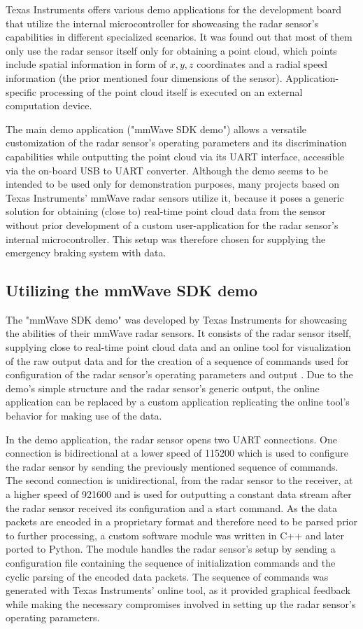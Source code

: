 \FloatBarrier\noindent
Texas Instruments offers various demo applications for the development board that utilize the internal microcontroller for showcasing the radar sensor's capabilities in different specialized scenarios.
It was found out that most of them only use the radar sensor itself only for obtaining a point cloud, which points include spatial information in form of $x,y,z$ coordinates and a radial speed information (the prior mentioned four dimensions of the sensor).
Application-specific processing of the point cloud itself is executed on an external computation device.
\par
The main demo application ("mmWave SDK demo") allows a versatile customization of the radar sensor's operating parameters and its discrimination capabilities while outputting the point cloud via its UART interface, accessible via the on-board USB to UART converter.
Although the demo seems to be intended to be used only for demonstration purposes, many projects based on Texas Instruments' mmWave radar sensors utilize it, because it poses a generic solution for obtaining (close to) real-time point cloud data from the sensor without prior development of a custom user-application for the radar sensor's internal microcontroller.
This setup was therefore chosen for supplying the emergency braking system with data.

\subsection{Utilizing the mmWave SDK demo}
The "mmWave SDK demo" was developed by Texas Instruments for showcasing the abilities of their mmWave radar sensors.
It consists of the radar sensor itself, supplying close to real-time point cloud data and an online tool for visualization of the raw output data and for the creation of a sequence of commands used for configuration of the radar sensor's operating parameters and output \cite{mmwave_demo_doc}.
Due to the demo's simple structure and the radar sensor's generic output, the online application can be replaced by a custom application replicating the online tool's behavior for making use of the data.
\par
In the demo application, the radar sensor opens two UART connections.
One connection is bidirectional at a lower speed of \SI{115200}{\baud} which is used to configure the radar sensor by sending the previously mentioned sequence of commands. 
The second connection is unidirectional, from the radar sensor to the receiver, at a higher speed of \SI{921600}{\baud} and is used for outputting a constant data stream after the radar sensor received its configuration and a start command.
As the data packets are encoded in a proprietary format and therefore need to be parsed prior to further processing, a custom software module was written in C++ and later ported to Python.
The module handles the radar sensor's setup by sending a configuration file containing the sequence of initialization commands and the cyclic parsing of the encoded data packets.
The sequence of commands was generated with Texas Instruments' online tool, as it provided graphical feedback while making the necessary compromises involved in setting up the radar sensor's operating parameters.

